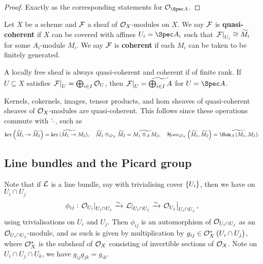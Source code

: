 \begin{proof}
Exactly as the corresponding statements for $ \OOO_{\Spec A} $.
\end{proof}

\begin{definition*}
Let $ X $ be a scheme and $ \mathcal{F} $ a sheaf of $ \mathcal{O}_X $-modules on $ X $. We say $ \mathcal{F} $ is \textbf{quasi-coherent} if $ X $ can be covered with affines $ U_i = \Spec A_i $ such that $ \left. \mathcal{F} \right|_{U_i} \cong \widetilde{M_i} $ for some $ A_i $-module $ M_i $. We say $ \mathcal{F} $ is \textbf{coherent} if each $ M_i $ can be taken to be finitely generated.
\end{definition*}

\begin{example*}
A locally free sheaf is always quasi-coherent and coherent if of finite rank. If $ U \subseteq X $ satisfies $ \left. \mathcal{F} \right|_U = \bigoplus_{i \in I} \mathcal{O}_U $, then $ \left. \mathcal{F} \right|_U = \widetilde{\bigoplus_{i \in I} A} $ for $ U = \Spec A $.
\end{example*}

Kernels, cokernels, images, tensor products, and hom sheaves of quasi-coherent sheaves of $ \mathcal{O}_X $-modules are quasi-coherent. This follows since these operations commute with $ \widetilde{\cdot} $, such as
$$ \ker \br{\widetilde{M_1} \to \widetilde{M_2}} = \widetilde{\ker \br{M_1 \to M_2}}, \quad \widetilde{M_1} \otimes_{\OOO_X} \widetilde{M_2} = \widetilde{M_1 \otimes_A M_2}, \quad \HOM_{\OOO_X}\br{\widetilde{M_1}, \widetilde{M_2}} = \widetilde{\Hom_A\br{M_1, M_2}}. $$

\pagebreak

\subsection{Line bundles and the Picard group}

\begin{remark*}
Note that if $ \mathcal{L} $ is a line bundle, say with trivialising cover $ \cbr{U_i} $, then we have on $ U_i \cap U_j $
$$ \phi_{ij} : \left. \mathcal{O}_{U_i} \right|_{U_i \cap U_j} \xrightarrow{\sim} \left. \mathcal{L} \right|_{U_i \cap U_j} \xrightarrow{\sim} \left. \mathcal{O}_{U_j} \right|_{U_i \cap U_j}, $$
using trivialisations on $ U_i $ and $ U_j $. Then $ \phi_{ij} $ is an automorphism of $ \mathcal{O}_{U_i \cap U_j} $ as an $ \mathcal{O}_{U_i \cap U_j} $-module, and as such is given by multiplication by $ g_{ij} \in \OOO_X^*\br{U_i \cap U_j} $, where $ \mathcal{O}_X^* $ is the subsheaf of $ \mathcal{O}_X $ consisting of invertible sections of $ \mathcal{O}_X $. Note on $ U_i \cap U_j \cap U_k $, we have $ g_{ij}g_{jk} = g_{ik} $.
\end{remark*}

